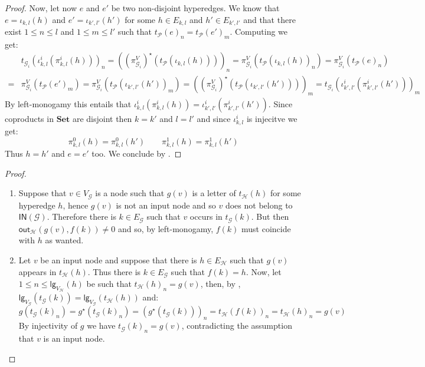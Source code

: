 \documentclass[3p]{elsarticle}
\newcommand{\lgh}{\mathsf{lg}}
\newcommand{\ino}[1]{\mathsf{IN}({\mathcal{#1}})}
\newcommand{\outd}[1]{\mathsf{out}_{\mathcal{#1}}}
\newcommand{\Set}{\mathbf{Set}}
\theoremstyle{remark}
\theoremstyle{definition}
\begin{document}
\begin{proof}
	Now, let now $e$ and $e'$ be two non-disjoint hyperedges. We know that $e=\iota_{k,l}(h)$ and $e'=\iota_{k',l'}(h')$ for some $h\in E_{k,l}$ and $h'\in E_{k', l'}$ and that there exist $1\leq n \leq l$ and $1\leq m \leq l'$ such that $t_{\mathcal{P}}(e)_n =t_{\mathcal{P}}(e')_m$.
	Computing we get:
\begin{align*}
& t_{\mathcal{G}_i}( \iota^i_{k,l}(\pi^i_{k,l}(h)))_n = ((\pi^V_{\mathcal{G}_i})^\star(t_{\mathcal{P}}(\iota_{k,l }(h))))_n= \pi^V_{\mathcal{G}_i}(t_{\mathcal{P}}(\iota_{k,l }(h))_n)=  \pi^V_{\mathcal{G}_i}(t_{\mathcal{P}}(e)_n)\\ =& \pi^V_{\mathcal{G}_i}(t_{\mathcal{P}}(e')_m)=\pi^V_{\mathcal{G}_i}(t_{\mathcal{P}}(\iota_{k',l' }(h'))_m) =((\pi^V_{\mathcal{G}_i})^\star(t_{\mathcal{P}}(\iota_{k',l' }(h'))))_m = t_{\mathcal{G}_i}( \iota^i_{k',l'}(\pi^i_{k',l'}(h')))_m
\end{align*}
	By left-monogamy this entails that $\iota^i_{k,l}(\pi^i_{k,l}(h)) = \iota^i_{k',l'}(\pi^i_{k',l'}(h'))$. Since coproducts in $\Set$ are disjoint then $k= k'$ and $l=l'$ and since $\iota^i_{k,l}$ is injecitve we get:
	\[\pi^0_{k,l}(h)= \pi^0_{k,l}(h') \qquad \pi^1_{k,l}(h)= \pi^1_{k,l}(h')\]
	Thus $h=h'$ and $e =e'$ too. We conclude by .
\end{proof}

\inp*
\begin{proof}\label{proof:inp}
	\begin{enumerate}
		\item Suppose that $v\in V_{\mathcal{G}}$ is a node such that $g(v)$ is a letter of $t_{\mathcal{H}}(h)$ for some hyperedge $h$, hence $g(v)$ is not an input node and so $v$ does not belong to $\ino{G}$. Therefore there is $k\in E_{\mathcal{G}}$ such that $v$ occurs in $t_{\mathcal{G}}(k)$. But then $\outd{H}(g(v), f(k))\neq 0$ and so, by left-monogamy, $f(k)$ must coincide with $h$ as wanted.
		\item  Let $v$ be an input node and suppose that there is $h\in E_{\mathcal{H}}$ such that $g(v)$ appears in $t_{\mathcal{H}}(h)$. Thus there is $k\in E_{\mathcal{G}}$ such that $f(k)=h$. Now, let $1\leq n\leq \lgh_{V_{\mathcal{H}}}(h)$ be such that $t_{\mathcal{H}}(h)_n=g(v)$, then, by , $\lgh_{V_{\mathcal{G}}}(t_{\mathcal{G}}(k))=\lgh_{V_{\mathcal{G}}}(t_{\mathcal{H}}(h))$ and:
		\[g(t_{\mathcal{G}}(k)_n)=g^\star(t_{\mathcal{G}}(k)_n)=(g^\star(t_{\mathcal{G}}(k)))_n=t_{\mathcal{H}}(f(k))_n = t_{\mathcal{H}}(h)_n=g(v)\]
		By injectivity of $g$ we have $t_{\mathcal{G}}(k)_n=g(v)$, contradicting the assumption that $v$ is an input node.	  \qedhere 
	\end{enumerate}
\end{proof}
\end{document}
